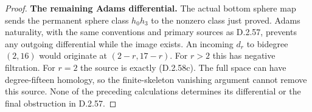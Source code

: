 \begin{proof}
\medskip\noindent
\textbf{The remaining Adams differential.}
The actual bottom sphere map sends the permanent sphere
class $h_0h_3$ to the nonzero class just proved.
Adams naturality, with the same conventions and primary
sources as D.2.57, prevents any outgoing differential
while the image exists.  An incoming $d_r$ to bidegree
$(2,16)$ would originate at
$(2-r,17-r)$.  For $r>2$ this has negative filtration.
For $r=2$ the source is exactly \textup{(D.2.58c)}.
The full space can have degree-fifteen homology, so the
finite-skeleton vanishing argument cannot remove this
source.  None of the preceding calculations determines
its differential or the final obstruction in D.2.57.
\end{proof}
